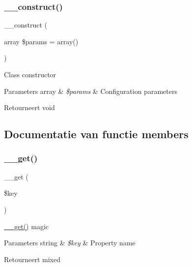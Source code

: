 \subsubsection{\texorpdfstring{\_\_construct()}{\_\_construct()}}
{\footnotesize\ttfamily \+\_\+\+\_\+construct (\begin{DoxyParamCaption}\item[{array}]{\$params = {\ttfamily array()} }\end{DoxyParamCaption})}

Class constructor


\begin{DoxyParams}[1]{Parameters}
array & {\em \$params} & Configuration parameters \\
\hline
\end{DoxyParams}
\begin{DoxyReturn}{Retourneert}
void 
\end{DoxyReturn}


\subsection{Documentatie van functie members}
\mbox{\label{class_c_i___encryption_a4537dad3b44254124991341cc91b28fb}} 
\subsubsection{\texorpdfstring{\_\_get()}{\_\_get()}}
{\footnotesize\ttfamily \+\_\+\+\_\+get (\begin{DoxyParamCaption}\item[{}]{\$key }\end{DoxyParamCaption})}

\mbox{\hyperlink{class_c_i___encryption_a4537dad3b44254124991341cc91b28fb}{\+\_\+\+\_\+get()}} magic


\begin{DoxyParams}[1]{Parameters}
string & {\em \$key} & Property name \\
\hline
\end{DoxyParams}
\begin{DoxyReturn}{Retourneert}
mixed 
\end{DoxyReturn}
\mbox{\label{class_c_i___encryption_a2b585f447a6282e702dd3153baf3d68f}} 
